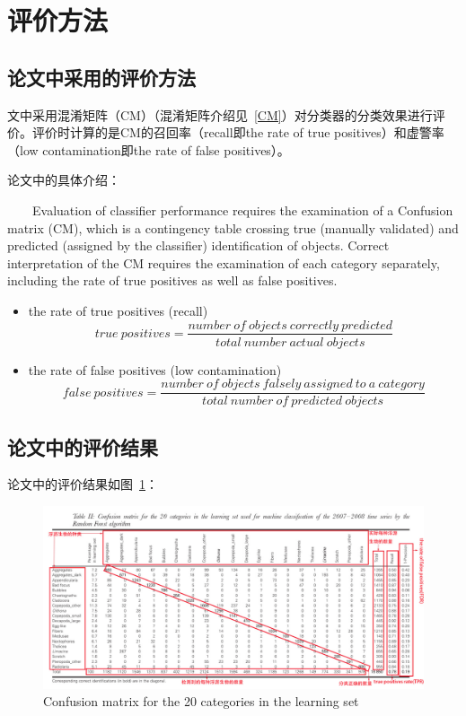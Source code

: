 \documentclass[12pt]{article}
\begin{document}
\section{评价方法}

\subsection{论文中采用的评价方法}
文中采用{\color{blue}混淆矩阵（CM）}（混淆矩阵介绍见~\ref{CM}）对分类器的分类效果进行评价。评价时计算的是CM的召回率（recall即the rate of true positives）和虚警率（low contamination即the rate of false positives）。

论文中的具体介绍：
\begin{tcolorbox}[colback=red!5,colframe=blue!75!black]
~~~~Evaluation of classifier performance requires the examination of a {\color{blue}Confusion matrix (CM)}, which is a contingency table crossing true (manually validated) and predicted (assigned by the classifier) identification of objects. Correct interpretation of the CM requires the examination of each category separately, including {\color{blue}the rate of true positives} as well as {\color{blue}false positives}.
\begin{itemize}
    \item the rate of true positives (recall)
        \begin{displaymath}
            true~positives=\frac{number~of~objects~correctly~predicted}{total~number~actual~objects}
        \end{displaymath}
    \item the rate of false positives (low contamination)
        \begin{displaymath}
            false~positives=\frac{number~of~objects~falsely~assigned~to~a~category}{total~number~of~predicted~objects}
        \end{displaymath}
\end{itemize}
\end{tcolorbox}

\subsection{论文中的评价结果}
论文中的评价结果如图~\ref{fig:cmlearn}：
    \begin{figure}[!ht]
      \centering 
        \includegraphics[width=1\textwidth]{cmlearn}
        \caption{Confusion matrix for the 20 categories in the learning set}
        \label{fig:cmlearn}
    \end{figure}
\end{document}
